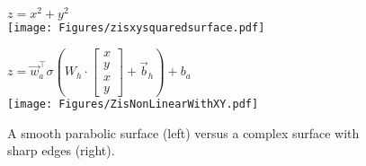 \documentclass{article}
\begin{document}
\begin{figure}[H]
    \centering
    \begin{minipage}{0.45\textwidth} %
        \centering
        \textbf{\(z = x^2 + y^2\)} %
        \\[0.5em] %
        \vspace{1em} %
        \hspace*{-1.5cm} %
        \texttt{[image: Figures/zisxysquaredsurface.pdf]} %
    \end{minipage}
    \hfill %
    \begin{minipage}{0.45\textwidth} %
        \centering
        \textbf{\(z = \vec{w}_a^\top \sigma\left(\mathit{W_h} \cdot 
        \begin{bmatrix}
        x \\ y \\ x \\ y
        \end{bmatrix}
        + \vec{b}_h
         \right) + b_a\)} %
        \\[0.5em] %
        \hspace*{-1.5cm} %
        \texttt{[image: Figures/ZisNonLinearWithXY.pdf]} %
    \end{minipage}
    \caption{A smooth parabolic surface (left) versus a complex surface with sharp edges (right).}
    \label{fig:three_d_manifolds}
\end{figure}
\end{document}
